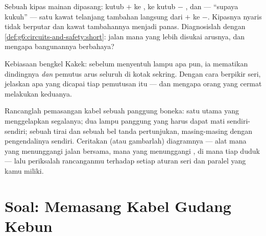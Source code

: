 \begin{exercise}[$\star\star$]\label{exo:g6:circuits-and-safety:10}
Sebuah kipas mainan dipasang: kutub $+$  ke ,  ke
kutub $-$ , dan --- ``supaya kukuh'' --- satu kawat telanjang
tambahan langsung dari $+$ ke $-$. Kipasnya nyaris tidak berputar dan
kawat tambahannya menjadi panas. Diagnosislah dengan
\cref{def:g6:circuits-and-safety:short}: jalan mana yang lebih disukai
arusnya, dan mengapa bangunannya berbahaya?
\end{exercise}

\begin{exercise}[$\star\star$]\label{exo:g6:circuits-and-safety:11}
Kebiasaan bengkel Kakek: sebelum menyentuh lampu apa pun, ia mematikan
 dindingnya \emph{dan} pemutus arus seluruh  di kotak
sekring. Dengan cara berpikir seri, jelaskan apa yang dicapai tiap
pemutusan itu --- dan mengapa orang yang cermat melakukan keduanya.
\end{exercise}

\begin{exercise}[$\star\star\star$]\label{exo:g6:circuits-and-safety:12}
Rancanglah pemasangan kabel sebuah panggung boneka: satu  utama
yang menggelapkan segalanya; dua lampu panggung yang harus dapat mati
sendiri-sendiri; sebuah  tirai dan sebuah bel tanda pertunjukan,
masing-masing dengan  pengendalinya sendiri. Ceritakan (atau
gambarlah) diagramnya --- alat mana yang menunggangi jalan bersama,
mana yang menunggangi , di mana tiap  duduk --- lalu
periksalah rancanganmu terhadap setiap aturan seri dan paralel yang
kamu miliki.
\end{exercise}

\section{Soal: Memasang Kabel Gudang Kebun}

